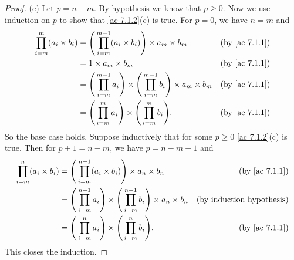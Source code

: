 \begin{proof}{(c)}
  Let \(p = n - m\).
  By hypothesis we know that \(p \geq 0\).
  Now we use induction on \(p\) to show that \cref{ac 7.1.2}(c) is true.
  For \(p = 0\), we have \(n = m\) and
  \begin{align*}
    \prod_{i = m}^m (a_i \times b_i) & = \Bigg(\prod_{i = m}^{m - 1} (a_i \times b_i)\Bigg) \times a_m \times b_m                                 & \text{(by \cref{ac 7.1.1})} \\
                                     & = 1 \times a_m \times b_m                                                                                  & \text{(by \cref{ac 7.1.1})} \\
                                     & = \Bigg(\prod_{i = m}^{m - 1} a_i\Bigg) \times \Bigg(\prod_{i = m}^{m - 1} b_i\Bigg) \times a_m \times b_m & \text{(by \cref{ac 7.1.1})} \\
                                     & = \Bigg(\prod_{i = m}^m a_i\Bigg) \times \Bigg(\prod_{i = m}^m b_i\Bigg).                                  & \text{(by \cref{ac 7.1.1})}
  \end{align*}
  So the base case holds.
  Suppose inductively that for some \(p \geq 0\) \cref{ac 7.1.2}(c) is true.
  Then for \(p + 1 = n - m\), we have \(p = n - m - 1\) and
  \begin{align*}
    \prod_{i = m}^n (a_i \times b_i) & = \Bigg(\prod_{i = m}^{n - 1} (a_i \times b_i)\Bigg) \times a_n \times b_n                                 & \text{(by \cref{ac 7.1.1})}      \\
                                     & = \Bigg(\prod_{i = m}^{n - 1} a_i\Bigg) \times \Bigg(\prod_{i = m}^{n - 1} b_i\Bigg) \times a_n \times b_n & \text{(by induction hypothesis)} \\
                                     & = \Bigg(\prod_{i = m}^n a_i\Bigg) \times \Bigg(\prod_{i = m}^n b_i\Bigg).                                  & \text{(by \cref{ac 7.1.1})}
  \end{align*}
  This closes the induction.
\end{proof}

